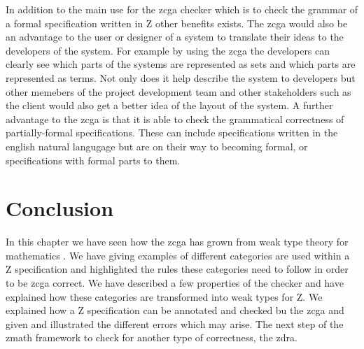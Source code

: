 In addition to the main use for the \gls{zcga} checker which is to check the grammar of a formal specification written in Z other benefits exists. The \gls{zcga} would also be an advantage to the user or designer of a system to translate their ideas to the developers of the system. For example by using the \gls{zcga} the developers can clearly see which parts of the systems are represented as sets and which parts are represented as terms. Not only does it help describe the system to developers but other memebers of the project development team and other stakeholders such as the client would also get a better idea of the layout of the system.
A further advantage to the \gls{zcga} is that it is able to check the grammatical correctness of partially-formal specifications. These can include specifications written in the english natural langugage but are on their way to becoming formal, or specifications with formal parts to them.

\section{Conclusion}
In this chapter we have seen how the \gls{zcga} has grown from weak type theory for mathematics \cite{wtt}. We have giving examples of different categories are used within a Z specification and highlighted the rules these categories need to follow in order to be \gls{zcga} correct. We have described a few properties of the checker and have explained how these categories are transformed into weak types for Z. We explained how a Z specification can be annotated and checked bu the \gls{zcga} and given and illustrated the different errors which may arise. The next step of the \gls{zmath} framework to check for another type of correctness, the \gls{zdra}.
